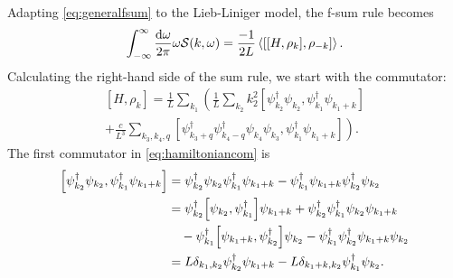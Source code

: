 \documentclass[11pt, a4paper]{report} %
\begin{document}
Adapting \cref{eq:generalfsum} to the Lieb-Liniger model, the f-sum rule becomes
\begin{equation}
  \label{eq:5}
  \int_{-\infty}^{\infty} \frac{\dd \omega}{2\pi} \omega\mathcal{S} (k, \omega) = \frac{-1}{2L} \expval{[[H,\rho_k],\rho_{-k}]}.
\end{equation}
Calculating the right-hand side of the sum rule, we start with the  commutator:
\begin{multline}
  \label{eq:hamiltoniancom}
  [H, \rho_k] = \frac{1}{L} \sum_{k_1} \left(\frac{1}{L} \sum_{k_2}k_2^2\left[\psi_{k_2}^{\dag}\psi_{k_2}, \psi_{k_1}^{\dag}\psi_{k_1+k}\right] \right.\\\left.+\frac{c}{L^3} \sum_{k_3, k_4, q} \left[\psi_{k_3+q}^{\dag}\psi_{k_4-q}^{\dag}\psi_{k_4}\psi_{k_3},\psi_{k_1}^{\dag}\psi_{k_1+k}\right]  \right).
\end{multline}
The first commutator in \cref{eq:hamiltoniancom} is 
\begin{align}
  \label{eq:7}
  \left[\psi_{k_2}^{\dag}\psi_{k_2}, \psi_{k_1}^{\dag}\psi_{k_1+k}\right] &= \psi_{k_2}^{\dag}\psi_{k_2} \psi_{k_1}^{\dag}\psi_{k_1+k} - \psi_{k_1}^{\dag}\psi_{k_1+k}\psi_{k_2}^{\dag}\psi_{k_2}\\
                                                                          &= \psi_{k_2}^{\dag}\qty[\psi_{k_2}, \psi_{k_1}^{\dag}]\psi_{k_1+k} +  \psi_{k_2}^{\dag}\psi_{k_1}^{\dag}\psi_{k_2}\psi_{k_1+k}\nonumber\\
                                                                          &\quad- \psi_{k_1}^{\dag}\qty[\psi_{k_1+k},\psi_{k_2}^{\dag}]\psi_{k_2} - \psi_{k_1}^{\dag}\psi_{k_2}^{\dag}\psi_{k_1+k}\psi_{k_2}\\
                                                                          &= L \delta_{k_1,k_2} \psi_{k_2}^{\dag}\psi_{k_1+k} - L \delta_{k_1+k,k_2}\psi_{k_1}^{\dag}\psi_{k_2} .
\end{align}
\end{document}
